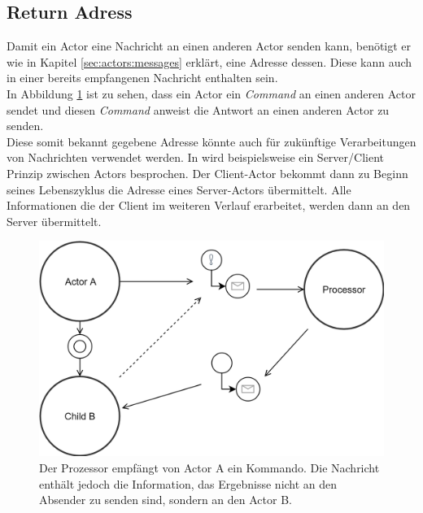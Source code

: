 
\subsection{Return Adress}
Damit ein Actor eine Nachricht an einen anderen Actor senden kann, benötigt er wie in Kapitel \ref{sec:actors:messages} erklärt, eine Adresse dessen. Diese kann auch in einer bereits empfangenen Nachricht enthalten sein. \\
In Abbildung \ref{fig:actor:patterns:returnAdress} ist zu sehen, dass ein Actor ein \textit{Command} an einen anderen Actor sendet und diesen \textit{Command} anweist die Antwort an einen anderen Actor zu senden. \\
Diese somit bekannt gegebene Adresse könnte auch für zukünftige Verarbeitungen von Nachrichten verwendet werden. In \cite{Vernon2015ReactiveAkka} wird beispielsweise ein Server/Client Prinzip zwischen Actors besprochen. Der Client-Actor bekommt dann zu Beginn seines Lebenszyklus die Adresse eines Server-Actors übermittelt. Alle Informationen die der Client im weiteren Verlauf erarbeitet, werden dann an den Server übermittelt.

\begin{figure}
  \centering
  \includegraphics[width=\linewidth]{gfx/actor/patterns/returnAddress}
  \caption{Der Prozessor empfängt von Actor A ein Kommando. Die Nachricht enthält jedoch die Information, das Ergebnisse nicht an den Absender zu senden sind, sondern an den Actor B.}
  \label{fig:actor:patterns:returnAdress}
\end{figure}



